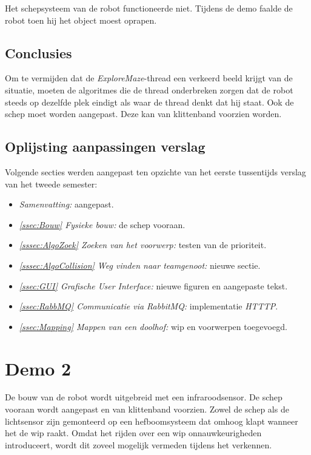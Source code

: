 \documentclass[eind]{penoverslag}
\begin{document}
Het schepsysteem van de robot functioneerde niet. Tijdens de demo faalde de robot toen hij het object moest oprapen. 

\subsection{Conclusies}
\label{Assec:conc1}
Om te vermijden dat de \textit{ExploreMaze}-thread een verkeerd beeld krijgt van de situatie, moeten de algoritmes die de thread onderbreken zorgen dat de robot steeds op dezelfde plek eindigt als waar de thread denkt dat hij staat.
Ook de schep moet worden aangepast. Deze kan van klittenband voorzien worden.

\subsection{Oplijsting aanpassingen verslag}
\label{Assec:aanp1}
Volgende secties werden aangepast ten opzichte van het eerste tussentijds verslag van het tweede semester:

\begin{itemize}
\item \textit{Samenvatting:} aangepast.
\item \textit{\ref{ssec:Bouw} Fysieke bouw:} de schep vooraan.
\item \textit{\ref{sssec:AlgoZoek} Zoeken van het voorwerp:} testen van de prioriteit.
\item \textit{\ref{sssec:AlgoCollision} Weg vinden naar teamgenoot:} nieuwe sectie.
\item \textit{\ref{ssec:GUI} Grafische User Interface:} nieuwe figuren en aangepaste tekst.
\item \textit{\ref{ssec:RabbMQ} Communicatie via RabbitMQ:} implementatie \textit{HTTTP}.
\item \textit{\ref{ssec:Mapping} Mappen van een doolhof:} wip en voorwerpen toegevoegd.
\end{itemize}

\section{Demo 2}
\label{Asec:demo2}
De bouw van de robot wordt uitgebreid met een infraroodsensor. De schep vooraan wordt aangepast en van klittenband voorzien. Zowel de schep als de lichtsensor zijn gemonteerd op een hefboomsysteem dat omhoog klapt wanneer het de wip raakt. Omdat het rijden over een wip onnauwkeurigheden introduceert, wordt dit zoveel mogelijk vermeden tijdens het verkennen.
\end{document}
